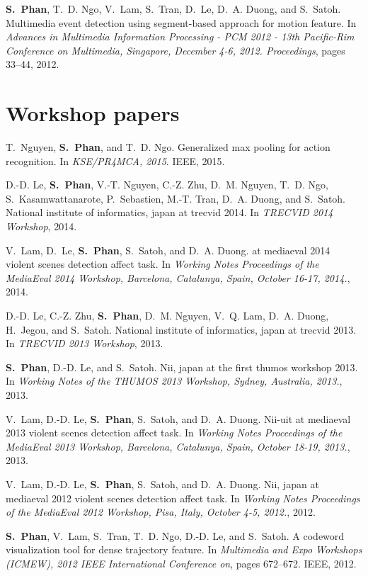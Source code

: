 \begin{thebibliography}{10}
\textbf{S.~Phan}, T.~D. Ngo, V.~Lam, S.~Tran, D.~Le, D.~A. Duong, and S.~Satoh.
\newblock Multimedia event detection using segment-based approach for motion
feature.
\newblock In {\em Advances in Multimedia Information Processing - {PCM} 2012 -
	13th Pacific-Rim Conference on Multimedia, Singapore, December 4-6, 2012.
	Proceedings}, pages 33--44, 2012.

\section*{Workshop papers}

T.~Nguyen, \textbf{S.~Phan}, and T.~D. Ngo.
\newblock Generalized max pooling for action recognition.
\newblock In {\em KSE/PR4MCA, 2015}. IEEE, 2015.

D.-D. Le, \textbf{S.~Phan}, V.-T. Nguyen, C.-Z. Zhu, D.~M. Nguyen, T.~D. Ngo,
S.~Kasamwattanarote, P.~Sebastien, M.-T. Tran, D.~A. Duong, and S.~Satoh.
\newblock National institute of informatics, japan at trecvid 2014.
\newblock In {\em TRECVID 2014 Workshop}, 2014.

V.~Lam, D.~Le, \textbf{S.~Phan}, S.~Satoh, and D.~A. Duong.
 at mediaeval 2014 violent scenes detection affect task.
\newblock In {\em Working Notes Proceedings of the MediaEval 2014 Workshop,
	Barcelona, Catalunya, Spain, October 16-17, 2014.}, 2014.

D.-D. Le, C.-Z. Zhu, \textbf{S.~Phan}, D.~M. Nguyen, V.~Q. Lam, D.~A. Duong, H.~Jegou,
and S.~Satoh.
\newblock National institute of informatics, japan at trecvid 2013.
\newblock In {\em TRECVID 2013 Workshop}, 2013.

\textbf{S.~Phan}, D.-D. Le, and S.~Satoh.
\newblock Nii, japan at the first thumos workshop 2013.
\newblock In {\em Working Notes of the THUMOS 2013 Workshop, Sydney, Australia, 2013.}, 2013.

V.~Lam, D.-D. Le, \textbf{S.~Phan}, S.~Satoh, and D.~A. Duong.
\newblock Nii-uit at mediaeval 2013 violent scenes detection affect task.
\newblock In {\em Working Notes Proceedings of the MediaEval 2013 Workshop,
	Barcelona, Catalunya, Spain, October 18-19, 2013.}, 2013.

V.~Lam, D.-D. Le, \textbf{S.~Phan}, S.~Satoh, and D.~A. Duong.
\newblock Nii, japan at mediaeval 2012 violent scenes detection affect task.
\newblock In {\em Working Notes Proceedings of the MediaEval 2012 Workshop,
	Pisa, Italy, October 4-5, 2012.}, 2012.


\textbf{S.~Phan}, V.~Lam, S.~Tran, T.~D. Ngo, D.-D. Le, and S.~Satoh.
\newblock A codeword visualization tool for dense trajectory feature.
\newblock In {\em Multimedia and Expo Workshops (ICMEW), 2012 IEEE
	International Conference on}, pages 672--672. IEEE, 2012.


\end{thebibliography}
